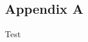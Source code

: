 \documentclass[
	letterpaper, %
	10pt, %
	unnumberedsections, %
	twoside, %
]{LTJournalArticle}
\begin{document}

\printbibliography %






\clearpage
\begin{appendices}
\section{Appendix A}
Test
\end{appendices}
\end{document}
